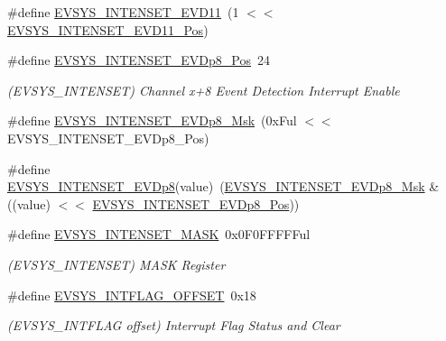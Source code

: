 \begin{DoxyCompactItemize}
\#define \mbox{\hyperlink{group___s_a_m_d21___e_v_s_y_s_ga53ba8a847ac16f4bf88cac4fb1dd2e6f}{E\+V\+S\+Y\+S\+\_\+\+I\+N\+T\+E\+N\+S\+E\+T\+\_\+\+E\+V\+D11}}~(1 $<$$<$ \mbox{\hyperlink{group___s_a_m_d21___e_v_s_y_s_ga59d53a19e9866dc43db2a1faaa987ef9}{E\+V\+S\+Y\+S\+\_\+\+I\+N\+T\+E\+N\+S\+E\+T\+\_\+\+E\+V\+D11\+\_\+\+Pos}})
\item 
\#define \mbox{\hyperlink{group___s_a_m_d21___e_v_s_y_s_ga4fefbe3a909a9ba529b46bc34f735485}{E\+V\+S\+Y\+S\+\_\+\+I\+N\+T\+E\+N\+S\+E\+T\+\_\+\+E\+V\+Dp8\+\_\+\+Pos}}~24
\begin{DoxyCompactList}\small\item\em (E\+V\+S\+Y\+S\+\_\+\+I\+N\+T\+E\+N\+S\+ET) Channel x+8 Event Detection Interrupt Enable \end{DoxyCompactList}\item 
\#define \mbox{\hyperlink{group___s_a_m_d21___e_v_s_y_s_gad122182789f04758a04a728e89615211}{E\+V\+S\+Y\+S\+\_\+\+I\+N\+T\+E\+N\+S\+E\+T\+\_\+\+E\+V\+Dp8\+\_\+\+Msk}}~(0x\+Ful $<$$<$ E\+V\+S\+Y\+S\+\_\+\+I\+N\+T\+E\+N\+S\+E\+T\+\_\+\+E\+V\+Dp8\+\_\+\+Pos)
\item 
\#define \mbox{\hyperlink{group___s_a_m_d21___e_v_s_y_s_gac58a0ccd7d6a99f21cf47277bfee6ca7}{E\+V\+S\+Y\+S\+\_\+\+I\+N\+T\+E\+N\+S\+E\+T\+\_\+\+E\+V\+Dp8}}(value)~(\mbox{\hyperlink{group___s_a_m_d21___e_v_s_y_s_gad122182789f04758a04a728e89615211}{E\+V\+S\+Y\+S\+\_\+\+I\+N\+T\+E\+N\+S\+E\+T\+\_\+\+E\+V\+Dp8\+\_\+\+Msk}} \& ((value) $<$$<$ \mbox{\hyperlink{group___s_a_m_d21___e_v_s_y_s_ga4fefbe3a909a9ba529b46bc34f735485}{E\+V\+S\+Y\+S\+\_\+\+I\+N\+T\+E\+N\+S\+E\+T\+\_\+\+E\+V\+Dp8\+\_\+\+Pos}}))
\item 
\#define \mbox{\hyperlink{group___s_a_m_d21___e_v_s_y_s_ga3703385b0ca9ffba38ace09ea09cca2c}{E\+V\+S\+Y\+S\+\_\+\+I\+N\+T\+E\+N\+S\+E\+T\+\_\+\+M\+A\+SK}}~0x0\+F0\+F\+F\+F\+F\+Ful
\begin{DoxyCompactList}\small\item\em (E\+V\+S\+Y\+S\+\_\+\+I\+N\+T\+E\+N\+S\+ET) M\+A\+SK Register \end{DoxyCompactList}\item 
\#define \mbox{\hyperlink{group___s_a_m_d21___e_v_s_y_s_gab538bb1832d35f863db2f03f217e7446}{E\+V\+S\+Y\+S\+\_\+\+I\+N\+T\+F\+L\+A\+G\+\_\+\+O\+F\+F\+S\+ET}}~0x18
\begin{DoxyCompactList}\small\item\em (E\+V\+S\+Y\+S\+\_\+\+I\+N\+T\+F\+L\+AG offset) Interrupt Flag Status and Clear \end{DoxyCompactList}\item 
$$
\end{DoxyCompactItemize}
